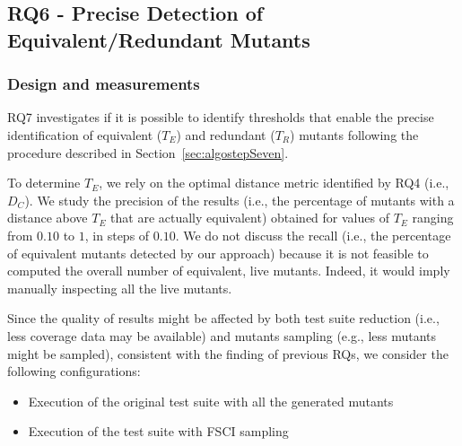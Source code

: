 





\subsection{RQ6 - Precise Detection of Equivalent/Redundant Mutants}

\subsubsection*{Design and measurements}

RQ7 investigates if it is possible to identify thresholds that enable the precise identification of equivalent ($T_E$) and redundant ($T_R$) mutants following the procedure described in Section~\ref{sec:algostepSeven}.

To determine $T_E$, 
we rely on the optimal distance metric identified by RQ4 (i.e., {$D_C$}).
We study the precision of the results (i.e., the percentage of mutants with a distance above $T_E$ that are actually equivalent) obtained for  values of $T_E$ ranging from $0.10$ to $1$, in steps of $0.10$.
{We do not discuss the recall (i.e., the percentage of equivalent mutants detected by our approach) because it is not feasible to computed the overall number of equivalent, live mutants. Indeed, it would imply manually inspecting all the live mutants.}

Since the quality of results might be affected by both test suite reduction (i.e., less coverage data may be available) and mutants sampling (e.g., less mutants might be sampled), consistent with the finding of previous RQs, we consider the following configurations: 
\begin{itemize}
\item Execution of the original test suite with all the generated mutants
\item Execution of the \APPR test suite with FSCI sampling
\end{itemize}

